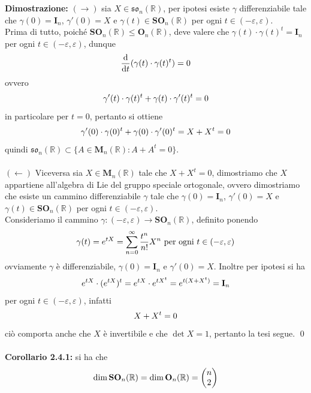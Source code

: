 \documentclass{article}
\begin{document}
\textbf{Dimostrazione:} $(\rightarrow)$ sia $X \in \mathfrak{so}_n(\mathbb{R})$, per ipotesi esiste $\gamma$ differenziabile tale che $\gamma(0) = \mathbf{I}_n$, $\gamma'(0) = X$ e $\gamma(t) \in \mathbf{SO}_n(\mathbb{R})$ per ogni $t \in (-\varepsilon, \varepsilon)$. \\
Prima di tutto, poiché $\mathbf{SO}_n(\mathbb{R}) \leq \mathbf{O}_n(\mathbb{R})$, deve valere che $\gamma(t) \cdot \gamma(t)^t = \mathbf{I}_n$ per ogni $t \in (-\varepsilon, \varepsilon)$, dunque
\begin{gather}
    \frac{\mathrm{d}}{\mathrm{d}t} (\gamma(t) \cdot \gamma(t)^t) = 0 \notag
\end{gather}
ovvero
\begin{gather}
    \gamma'(t) \cdot \gamma(t)^t + \gamma(t) \cdot \gamma'(t)^t = 0 \notag
\end{gather}
in particolare per $t = 0$, pertanto si ottiene
\begin{gather}
    \gamma'(0) \cdot \gamma (0)^t + \gamma(0) \cdot \gamma'(0)^t = X + X^t = 0 \notag
\end{gather}
quindi $\mathfrak{so}_n(\mathbb{R}) \subset \{ A \in \mathbf{M}_n(\mathbb{R}) : A + A^t = 0 \}$. \\ \\
$(\leftarrow)$ Viceversa sia $X \in \mathbf{M}_n(\mathbb{R})$ tale che $X + X^t = 0$, dimostriamo che $X$ appartiene all'algebra di Lie del gruppo speciale ortogonale, ovvero dimostriamo che esiste un cammino differenziabile $\gamma$ tale che $\gamma(0) = \mathbf{I}_n$, $\gamma'(0) = X$ e $\gamma(t) \in \mathbf{SO}_n(\mathbb{R})$ per ogni $t \in (-\varepsilon, \varepsilon)$. \\
Consideriamo il cammino $\gamma : (-\varepsilon, \varepsilon) \longrightarrow \mathbf{SO}_n(\mathbb{R})$, definito ponendo
\begin{gather}
    \gamma(t) = e^{tX} = \sum_{n = 0}^\infty \frac{t^n}{n!}X^n \text{ per ogni } t \in (-\varepsilon, \varepsilon) \notag
\end{gather}
ovviamente $\gamma$ è differenziabile, $\gamma(0) = \mathbf{I}_n$ e $\gamma'(0) = X$. Inoltre per ipotesi si ha
\begin{gather}
    e^{tX} \cdot (e^{tX})^t = e^{tX} \cdot e^{tX^t} = e^{t(X + X^t)} = \mathbf{I}_n \notag
\end{gather}
per ogni $t \in (-\varepsilon, \varepsilon)$, infatti
\begin{gather}
    X + X^t = 0 \notag
\end{gather}
ciò comporta anche che $X$ è invertibile e che $\det X = 1$, pertanto la tesi segue. \qed \\ \\
\textbf{Corollario 2.4.1:} si ha che
\begin{gather}
    \dim \mathbf{SO}_n(\mathbb{R}) = \dim \mathbf{O}_n(\mathbb{R}) = \begin{pmatrix}
        n \\
        2
    \end{pmatrix} \notag
\end{gather}
\end{document}

